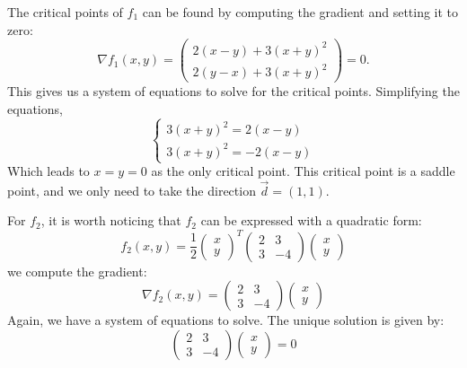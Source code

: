 \begin{answer}
    \rpos
    \begin{answerenum}
        \item The critical points of \(f_1\) can be found by computing the gradient and setting it to zero:
            \[
            \nabla f_1(x,y) = \begin{pmatrix}
            2(x-y) + 3(x+y)^2 \\
            2(y-x) + 3(x+y)^2
            \end{pmatrix} = 0.
            \]
            This gives us a system of equations to solve for the critical points.
            Simplifying the equations,
            \[
            \begin{cases}
                3(x+y)^2 = 2(x-y) \\
                3(x+y)^2 = -2(x-y)
            \end{cases}
            \]
            Which leads to \(x = y = 0\) as the only critical point.
            This critical point is a saddle point, and we only need to take the direction \(\vec{d}=(1, 1)\).
        \item For \(f_2\), it is worth noticing that \(f_2\) can be expressed with a quadratic form:
            \[
            f_2(x, y) = \frac{1}{2} \begin{pmatrix} x \\ y \end{pmatrix}^T \begin{pmatrix} 2 & 3 \\ 3 & -4 \end{pmatrix} \begin{pmatrix} x \\ y \end{pmatrix}
            \]
            we compute the gradient:
            \[
            \nabla f_2(x,y) = \begin{pmatrix} 2 & 3 \\ 3 & -4 \end{pmatrix} \begin{pmatrix} x \\ y \end{pmatrix} 
            \]
            Again, we have a system of equations to solve. The unique solution is given by:
            \[
            \begin{pmatrix} 2 & 3 \\ 3 & -4 \end{pmatrix} \begin{pmatrix} x \\ y \end{pmatrix} = 0
\]
\end{answerenum}
\end{answer}
